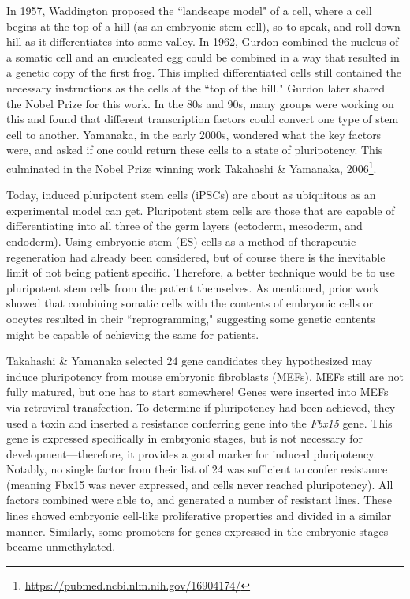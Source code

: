 In 1957, Waddington proposed the ``landscape model" of a cell, where a cell begins at the top of a hill (as an embryonic stem cell), so-to-speak, and roll down hill as it differentiates into some valley. In 1962, Gurdon combined the nucleus of a somatic cell and an enucleated egg could be combined in a way that resulted in a genetic copy of the first frog. This implied differentiated cells still contained the necessary instructions as the cells at the ``top of the hill." Gurdon later shared the Nobel Prize for this work. In the 80s and 90s, many groups were working on this and found that different transcription factors could convert one type of stem cell to another. Yamanaka, in the early 2000s, wondered what the key factors were, and asked if one could return these cells to a state of pluripotency. This culminated in the Nobel Prize winning work Takahashi \& Yamanaka, 2006\footnote{\url{https://pubmed.ncbi.nlm.nih.gov/16904174/}}.\newline

Today, induced pluripotent stem cells (iPSCs) are about as ubiquitous as an experimental model can get. Pluripotent stem cells are those that are capable of differentiating into all three of the germ layers (ectoderm, mesoderm, and endoderm). Using embryonic stem (ES) cells as a method of therapeutic regeneration had already been considered, but of course there is the inevitable limit of not being patient specific. Therefore, a better technique would be to use pluripotent stem cells from the patient themselves. As mentioned, prior work showed that combining somatic cells with the contents of embryonic cells or oocytes resulted in their ``reprogramming," suggesting some genetic contents might be capable of achieving the same for patients.\newline

Takahashi \& Yamanaka selected 24 gene candidates they hypothesized may induce pluripotency from mouse embryonic fibroblasts (MEFs). MEFs still are not fully matured, but one has to start somewhere! Genes were inserted into MEFs via retroviral transfection. To determine if pluripotency had been achieved, they used a toxin and inserted a resistance conferring gene into the \textit{Fbx15} gene. This gene is expressed specifically in embryonic stages, but is not necessary for development---therefore, it provides a good marker for induced pluripotency. Notably, no single factor from their list of 24 was sufficient to confer resistance (meaning Fbx15 was never expressed, and cells never reached pluripotency). All factors combined were able to, and generated a number of resistant lines. These lines showed embryonic cell-like proliferative properties and divided in a similar manner. Similarly, some promoters for genes expressed in the embryonic stages became unmethylated. \newline

